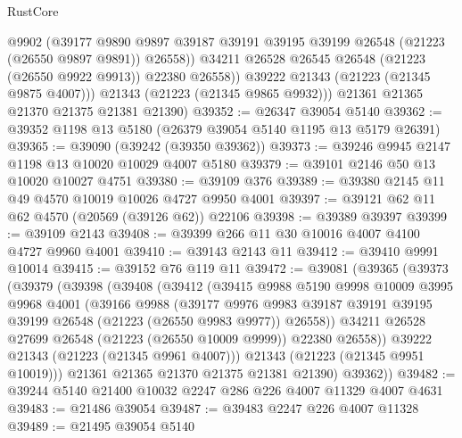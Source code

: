 \begin{lexlean}{RustCore}
\begin{coremodule}
                @9902
                (@39177
                  @9890
                  @9897
                  @39187
                  @39191
                  @39195
                  @39199
                  @26548
                  (@21223 (@26550 @9897 @9891))
                  @26558))
              @34211
              @26528
              @26545
              @26548
              (@21223 (@26550 @9922 @9913))
              @22380
              @26558))
          @39222
          @21343
          (@21223 (@21345 @9875 @4007)))
        @21343
        (@21223 (@21345 @9865 @9932)))
      @21361
      @21365
      @21370
      @21375
      @21381
      @21390)
@39352 := @26347 @39054 @5140
@39362 := @39352 @1198 @13 @5180 (@26379 @39054 @5140 @1195 @13 @5179 @26391)
@39365 := @39090 (@39242 (@39350 @39362))
@39373 := @39246 @9945 @2147 @1198 @13 @10020 @10029 @4007 @5180
@39379 := @39101 @2146 @50 @13 @10020 @10027 @4751
@39380 := @39109 @376
@39389 := @39380 @2145 @11 @49 @4570 @10019 @10026 @4727 @9950 @4001
@39397 := @39121 @62 @11 @62 @4570 (@20569 (@39126 @62)) @22106
@39398 := @39389 @39397
@39399 := @39109 @2143
@39408 := @39399 @266 @11 @30 @10016 @4007 @4100 @4727 @9960 @4001
@39410 := @39143 @2143 @11
@39412 := @39410 @9991 @10014
@39415 := @39152 @76 @119 @11
@39472 := @39081
    (@39365
      (@39373
        (@39379
          (@39398
            (@39408
              (@39412
                (@39415
                  @9988
                  @5190
                  @9998
                  @10009
                  @3995
                  @9968
                  @4001
                  (@39166
                    @9988
                    (@39177
                      @9976
                      @9983
                      @39187
                      @39191
                      @39195
                      @39199
                      @26548
                      (@21223 (@26550 @9983 @9977))
                      @26558))
                  @34211
                  @26528
                  @27699
                  @26548
                  (@21223 (@26550 @10009 @9999))
                  @22380
                  @26558))
              @39222
              @21343
              (@21223 (@21345 @9961 @4007)))
            @21343
            (@21223 (@21345 @9951 @10019)))
          @21361
          @21365
          @21370
          @21375
          @21381
          @21390)
        @39362))
@39482 := @39244 @5140 @21400 @10032 @2247 @286 @226 @4007 @11329 @4007 @4631
@39483 := @21486 @39054
@39487 := @39483 @2247 @226 @4007 @11328
@39489 := @21495 @39054 @5140

\end{coremodule}
\end{lexlean}
